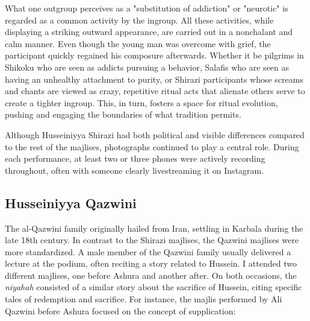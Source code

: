 What one outgroup perceives as a "substitution of addiction" or  "neurotic" is regarded as a common activity by the ingroup. All these activities, while displaying a striking outward appearance, are carried out in a nonchalant and calm manner. Even though the young man was overcome with grief, the participant quickly regained his composure afterwards. Whether it be pilgrims in Shikoku who are seen as addicts pursuing a behavior, Salafis who are seen as having an unhealthy attachment to purity, or Shirazi participants whose screams and chants are viewed as crazy, repetitive ritual acts that alienate others serve to create a tighter ingroup. This, in turn, fosters a space for ritual evolution, pushing and engaging the boundaries of what tradition permits.

Although Husseiniyya Shirazi had both political and visible differences compared to the rest of the majlises, photographs continued to play a central role. During each performance, at least two or three phones were actively recording throughout, often with someone clearly livestreaming it on Instagram.

\subsection{Husseiniyya Qazwini}
The al-Qazwini family originally hailed from Iran, settling in Karbala during the late 18th century. In contrast to the Shirazi majlises, the Qazwini majlises were more standardized. A male member of the Qazwini family usually delivered a lecture at the podium, often reciting a story related to Hussein. I attended two different majlises, one before Ashura and another after. On both occasions, the \emph{niyahah} consisted of a similar story about the sacrifice of Hussein, citing specific tales of redemption and sacrifice. For instance, the majlis performed by Ali Qazwini before Ashura focused on the concept of supplication:


